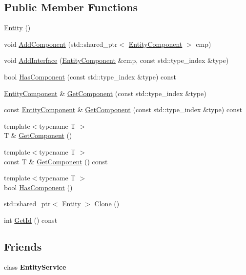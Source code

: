 \subsection*{Public Member Functions}
\begin{DoxyCompactItemize}
\item 
\hyperlink{classastu_1_1Entity_aed9aac4a995b5c044c0301302f2bd3d0}{Entity} ()
\item 
void \hyperlink{classastu_1_1Entity_ab8f47f4de88139f9202466b726e61aee}{Add\+Component} (std\+::shared\+\_\+ptr$<$ \hyperlink{classastu_1_1EntityComponent}{Entity\+Component} $>$ cmp)
\item 
void \hyperlink{classastu_1_1Entity_adc6d15be60fde34b516546bdc92ff13f}{Add\+Interface} (\hyperlink{classastu_1_1EntityComponent}{Entity\+Component} \&cmp, const std\+::type\+\_\+index \&type)
\item 
bool \hyperlink{classastu_1_1Entity_ad1ee4a4e617de7c40eb252413b9045a1}{Has\+Component} (const std\+::type\+\_\+index \&type) const
\item 
\hyperlink{classastu_1_1EntityComponent}{Entity\+Component} \& \hyperlink{classastu_1_1Entity_a3d9bb583859f1a941fdaad76f5093323}{Get\+Component} (const std\+::type\+\_\+index \&type)
\item 
const \hyperlink{classastu_1_1EntityComponent}{Entity\+Component} \& \hyperlink{classastu_1_1Entity_affe49f8c35d5b067f06803e27243189a}{Get\+Component} (const std\+::type\+\_\+index \&type) const
\item 
{\footnotesize template$<$typename T $>$ }\\T \& \hyperlink{classastu_1_1Entity_aeabb500a719de29039dd0fad4ea553c4}{Get\+Component} ()
\item 
{\footnotesize template$<$typename T $>$ }\\const T \& \hyperlink{classastu_1_1Entity_a140865878b65472e3c11fda593ef80ec}{Get\+Component} () const
\item 
{\footnotesize template$<$typename T $>$ }\\bool \hyperlink{classastu_1_1Entity_a80b75df1873d23f79f050bc6a178cd4c}{Has\+Component} ()
\item 
std\+::shared\+\_\+ptr$<$ \hyperlink{classastu_1_1Entity}{Entity} $>$ \hyperlink{classastu_1_1Entity_af7dc70da55f0110ffb340c839483debe}{Clone} ()
\item 
int \hyperlink{classastu_1_1Entity_ab64fa42f507c05701afa182f1c08dc1d}{Get\+Id} () const
\end{DoxyCompactItemize}
\subsection*{Friends}
\begin{DoxyCompactItemize}
\item 
\mbox{\label{classastu_1_1Entity_a4c3d8b5a7c2dad3d37b2b4af85b8c4ad}} 
class {\bfseries Entity\+Service}
\end{DoxyCompactItemize}



